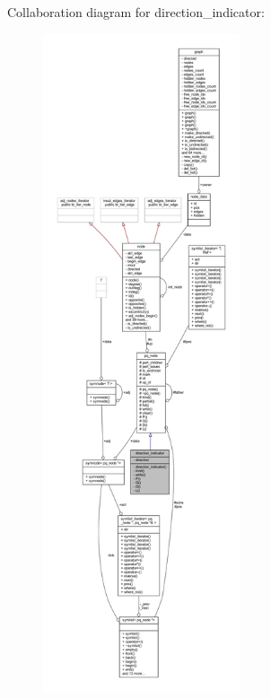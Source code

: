 Collaboration diagram for direction\+\_\+indicator\+:\nopagebreak
\begin{figure}[H]
\begin{center}
\leavevmode
\includegraphics[height=550pt]{classdirection__indicator__coll__graph}
\end{center}
\end{figure}

